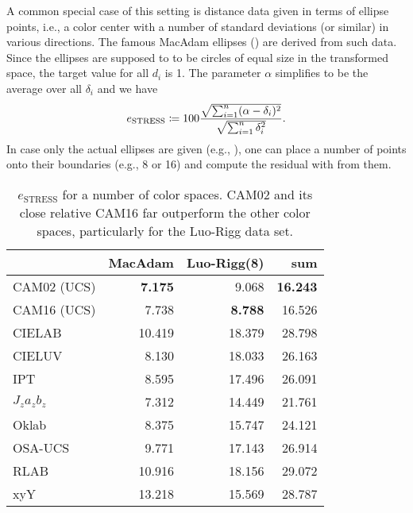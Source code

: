 \documentclass{scrartcl}
\theoremstyle{named}
\begin{document}
A common special case of this setting is distance data given in terms of ellipse points,
i.e., a color center with a number of standard deviations (or similar) in various
directions. The famous MacAdam ellipses (\cite{macadam1942}) are derived from such data.
Since the ellipses are supposed to to be circles of equal size in the transformed space,
the target value for all $d_i$ is 1. The parameter $\alpha$ simplifies to be the average
over all $\delta_i$ and we have
\begin{equation}\label{eq:e}
  e_{\text{STRESS}}
  \coloneqq
  100
  \frac{%
    \sqrt{\sum_{i=1}^n (\alpha - \delta_{i})^2}
  }{
    \sqrt{\sum_{i=1}^n \delta_i^2}
  }.
\end{equation}
In case only the actual ellipses are given (e.g., \cite{luorigg}), one can place a
number of points onto their boundaries (e.g., 8 or 16) and compute the residual with
from them.

\begin{table}
  \centering
  \begin{tabular}{lrrr}
    \toprule
    & MacAdam & Luo-Rigg(8) & sum\\
    \midrule
CAM02 (UCS)   & \textbf{7.175} &         9.068  & \textbf{16.243}\\
CAM16 (UCS)   &         7.738  & \textbf{8.788} &         16.526\\
CIELAB        &        10.419  &        18.379  &         28.798\\
CIELUV        &         8.130  &        18.033  &         26.163\\
IPT           &         8.595  &        17.496  &         26.091\\
$J_z a_z b_z$ &         7.312  &        14.449  &         21.761\\
Oklab         &         8.375  &        15.747  &         24.121\\
OSA-UCS       &         9.771  &        17.143  &         26.914\\
RLAB          &        10.916  &        18.156  &         29.072\\
xyY           &        13.218  &        15.569  &         28.787\\
    \bottomrule
  \end{tabular}
  \caption{$e_\text{STRESS}$ for a number of color spaces. CAM02 and its close relative
  CAM16 far outperform the other color spaces, particularly for the Luo-Rigg data set.}
\end{table}
\end{document}
